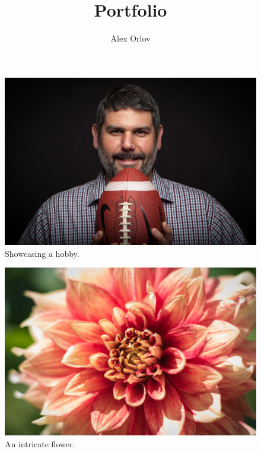 \documentclass{report}
\title{Portfolio}
\author{Alex Orlov}
\date{}
\begin{document}
\maketitle

\begin{figure}
  \includegraphics[width=\linewidth]{res/portraitstudiofootball.jpg}
  \caption{Showcasing a hobby.}
\end{figure}

\begin{figure}
  \includegraphics[width=\linewidth]{res/flowermacro.jpg}
  \caption{An intricate flower.}
\end{figure}
\end{document}
